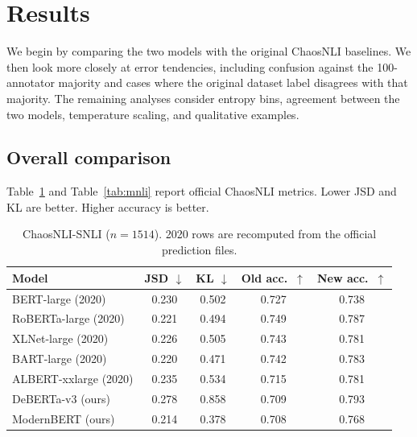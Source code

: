 \documentclass[11pt,a4paper]{article}
\begin{document}
\section{Results}

We begin by comparing the two models with the original ChaosNLI baselines. We then look more closely at error tendencies, including confusion against the 100-annotator majority and cases where the original dataset label disagrees with that majority. The remaining analyses consider entropy bins, agreement between the two models, temperature scaling, and qualitative examples.

\subsection{Overall comparison}

Table~\ref{tab:snli} and Table~\ref{tab:mnli} report official ChaosNLI metrics. Lower JSD and KL are better. Higher accuracy is better.

\begin{table}[H]
\centering
\small
\caption{ChaosNLI-SNLI ($n=1514$). 2020 rows are recomputed from the official prediction files.}
\label{tab:snli}
\begin{tabular}{lcccc}
\toprule
Model & JSD $\downarrow$ & KL $\downarrow$ & Old acc.\ $\uparrow$ & New acc.\ $\uparrow$ \\
\midrule
BERT-large (2020) & 0.230 & 0.502 & 0.727 & 0.738 \\
RoBERTa-large (2020) & 0.221 & 0.494 & 0.749 & 0.787 \\
XLNet-large (2020) & 0.226 & 0.505 & 0.743 & 0.781 \\
BART-large (2020) & 0.220 & 0.471 & 0.742 & 0.783 \\
ALBERT-xxlarge (2020) & 0.235 & 0.534 & 0.715 & 0.781 \\
DeBERTa-v3 (ours) & 0.278 & 0.858 & 0.709 & 0.793 \\
ModernBERT (ours) & 0.214 & 0.378 & 0.708 & 0.768 \\
\bottomrule
\end{tabular}
\end{table}
\end{document}
